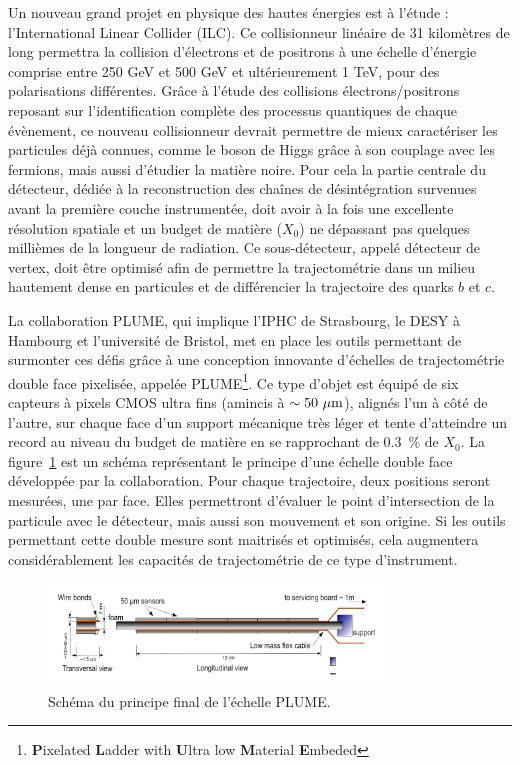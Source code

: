   Un nouveau grand projet en physique des hautes énergies est à l'étude : l'International Linear Collider (ILC). 
  Ce collisionneur linéaire de 31 kilomètres de long permettra la collision d'électrons et de positrons à une échelle d'énergie comprise entre 250 GeV et 500 GeV et ultérieurement 1 TeV, pour des polarisations différentes.
  Grâce à l'étude des collisions électrons/positrons reposant sur l'identification complète des processus quantiques de chaque évènement, ce nouveau collisionneur devrait permettre de mieux caractériser les particules déjà connues, comme le boson de Higgs grâce à son couplage avec les fermions, mais aussi d'étudier la matière noire.
  Pour cela la partie centrale du détecteur, dédiée à la reconstruction des chaînes de désintégration survenues avant la première couche instrumentée, doit avoir à la fois une excellente résolution spatiale et un budget de matière ($X_0$) ne dépassant pas quelques millièmes de la longueur de radiation. 
  Ce sous-détecteur, appelé détecteur de vertex, doit être optimisé afin de permettre la trajectométrie dans un milieu hautement dense en particules et de différencier la trajectoire des quarks $b$ et $c$.

  La collaboration PLUME, qui implique l'IPHC de Strasbourg, le DESY à Hambourg et l'université de Bristol, met en place les outils permettant de surmonter ces défis grâce à une conception innovante d'échelles de trajectométrie double face pixelisée, appelée PLUME\footnote{\textbf{P}ixelated \textbf{L}adder with \textbf{U}ltra low \textbf{M}aterial \textbf{E}mbeded}\cite{PLUME}. 
  Ce type d'objet est équipé de six capteurs à pixels CMOS ultra fins (amincis à $\sim 50~\mu\rm{m}$), alignés l'un à côté de l'autre, sur chaque face d'un support mécanique très léger et tente d'atteindre un record au niveau du budget de matière en se rapprochant de 0.3~\% de $X_0$.
  La figure~\ref{fig:PLUME_resume} est un schéma représentant le principe d'une échelle double face développée par la collaboration.
  Pour chaque trajectoire, deux positions seront mesurées, une par face. 
  Elles permettront d'évaluer le point d'intersection de la particule avec le détecteur, mais aussi son mouvement et son origine. 
  Si les outils permettant cette double mesure sont maitrisés et optimisés, cela augmentera considérablement les capacités de trajectométrie de ce type d'instrument.

  \begin{figure}
    \centering
    \includegraphics[width = 0.8\textwidth]{Pictures/vxd/plume_finalGoal.png}
    \caption{Schéma du principe final de l'échelle PLUME.}
    \label{fig:PLUME_resume}
  \end{figure}

